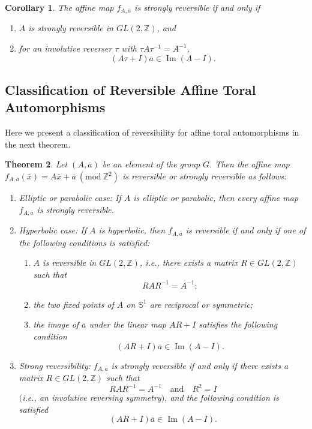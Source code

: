 \documentclass[12pt]{amsart}
\theoremstyle{plain}
\newtheorem{theorem}{Theorem}[section]
\newtheorem{corollary}[theorem]{Corollary}
\theoremstyle{definition}
\theoremstyle{remark}
\begin{document}
\begin{corollary}\label{5sr}
 The affine map $f_{A,\overline{a}}$ is strongly reversible if and only if
\begin{enumerate}
    \item $A$ is strongly reversible in $GL(2,\mathbb{Z})$, and
    \item for an involutive reverser $\tau$ with $\tau A\tau^{-1}=A^{-1}$,
    $$
    (A\tau +I)\overline{a}\in\operatorname{Im}(A-I).
    $$
\end{enumerate}
\end{corollary}

\subsection{Classification of Reversible Affine Toral Automorphisms}

Here we present a classification of reversibility for affine toral automorphisms in the next theorem. 

\begin{theorem}\label{revtoraut} 
Let $(A,\overline{a})$ be an element of the group $G$.  
Then the affine map $f_{A,\overline{a}}(\bar{x})=A\bar{x}+\overline{a}~(\text{mod}~\mathbb{Z}^2)$ is reversible or strongly reversible as follows:

\begin{enumerate}
    \item \textit{Elliptic or parabolic case:}  
    If $A$ is elliptic or parabolic, then every affine map $f_{A,\overline{a}}$ is strongly reversible.

    \item \textit{Hyperbolic case:}  
    If $A$ is hyperbolic, then $f_{A,\overline{a}}$ is \emph{reversible} if and only if one of the following conditions is satisfied:
    \begin{enumerate}
        \item $A$ is reversible in $GL(2,\mathbb{Z})$, i.e., there exists a matrix $R \in GL(2,\mathbb{Z})$ such that
        $$
        RAR^{-1}=A^{-1};
        $$
        \item the two fixed points of $A$ on $\mathbb{S}^{1}$ are reciprocal or symmetric;
        \item the image of $\bar{a}$ under the linear map $AR+I$ satisfies the following condition
        $$
        (AR+I)\overline{a} \in \operatorname{Im}(A-I).
        $$
    \end{enumerate}

    \item \textit{Strong reversibility:}  
    $f_{A,\overline{a}}$ is \emph{strongly reversible} if and only if there exists a matrix $R \in GL(2,\mathbb{Z})$ such that
    $$
    RAR^{-1}=A^{-1} \quad \text{and} \quad R^2=I
    $$
    $($i.e., an involutive reversing symmetry$)$, and the following condition is satisfied
    $$
    (AR+I)\overline{a} \in \operatorname{Im}(A-I).
    $$
\end{enumerate}
\end{theorem}
\end{document}
